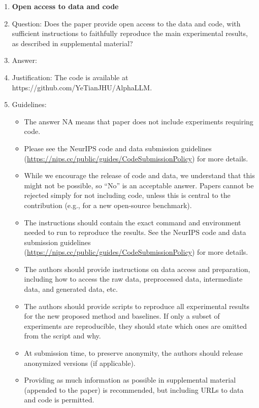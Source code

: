 \documentclass{article}
\begin{document}
\begin{enumerate}
\item {\bf Open access to data and code}
    \item[] Question: Does the paper provide open access to the data and code, with sufficient instructions to faithfully reproduce the main experimental results, as described in supplemental material?
    \item[] Answer: \answerYes{}{} %
    \item[] Justification: The code is available at https://github.com/YeTianJHU/AlphaLLM.
    \item[] Guidelines:
    \begin{itemize}
        \item The answer NA means that paper does not include experiments requiring code.
        \item Please see the NeurIPS code and data submission guidelines (\url{https://nips.cc/public/guides/CodeSubmissionPolicy}) for more details.
        \item While we encourage the release of code and data, we understand that this might not be possible, so “No” is an acceptable answer. Papers cannot be rejected simply for not including code, unless this is central to the contribution (e.g., for a new open-source benchmark).
        \item The instructions should contain the exact command and environment needed to run to reproduce the results. See the NeurIPS code and data submission guidelines (\url{https://nips.cc/public/guides/CodeSubmissionPolicy}) for more details.
        \item The authors should provide instructions on data access and preparation, including how to access the raw data, preprocessed data, intermediate data, and generated data, etc.
        \item The authors should provide scripts to reproduce all experimental results for the new proposed method and baselines. If only a subset of experiments are reproducible, they should state which ones are omitted from the script and why.
        \item At submission time, to preserve anonymity, the authors should release anonymized versions (if applicable).
        \item Providing as much information as possible in supplemental material (appended to the paper) is recommended, but including URLs to data and code is permitted.
    \end{itemize}



\end{enumerate}
\end{document}
